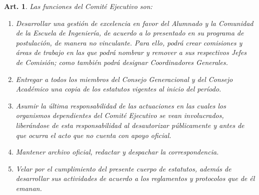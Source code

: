 \documentclass[letterpaper,11pt]{article}
\theoremstyle{plain}
\newtheorem{art}{Art.} %
\begin{document}
		\begin{art}\label{funcionesEjecutivo1}
			Las funciones del Comité Ejecutivo son:
			\begin{enumerate}
				\item Desarrollar una gestión de excelencia en favor del Alumnado y la Comunidad de la Escuela de Ingeniería, de acuerdo a lo presentado en su programa de postulación, de manera no vinculante. Para ello, podrá crear comisiones y áreas de trabajo en las que podrá nombrar y remover a sus respectivos Jefes de Comisión; como también podrá designar Coordinadores Generales.

				\item Entregar a todos los miembros del Consejo Generacional y del Consejo Académico una copia de los estatutos vigentes al inicio del período.
				
				\item Asumir la última responsabilidad de las actuaciones en las cuales los organismos dependientes del Comité Ejecutivo se vean involucrados, liberándose de esta responsabilidad al desautorizar públicamente y antes de que ocurra el acto que no cuenta con apoyo oficial.
				
				\item Mantener archivo oficial, redactar y despachar la correspondencia.
				
				\item Velar por el cumplimiento del presente cuerpo de estatutos, además de desarrollar sus actividades de acuerdo a los reglamentos y protocolos que de él emanan.
			\end{enumerate}
		\end{art}
\end{document}
